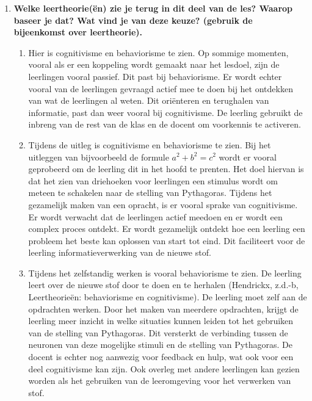 \documentclass{article}
\begin{document}
\begin{enumerate}[label=(\alph*)]
\begin{enumerate}[label=\arabic*.]
                    \end{enumerate}
                \item \textbf{Welke leertheorie(ën) zie je terug in dit deel van de les? Waarop baseer je dat? Wat vind je van deze keuze? (gebruik de bijeenkomst over leertheorie).} \\
                    \begin{enumerate}[label=\arabic*.]
                        \item Hier is cognitivisme en behaviorisme te zien. Op sommige momenten, vooral als er een koppeling wordt gemaakt naar het lesdoel, zijn de leerlingen vooral passief. Dit past bij behaviorisme. Er wordt echter vooral van de leerlingen gevraagd actief mee te doen bij het ontdekken van wat de leerlingen al weten. Dit oriënteren en terughalen van informatie, past dan weer vooral bij cognitivisme. De leerling gebruikt de inbreng van de rest van de klas en de docent om voorkennis te activeren.\\
                        \item Tijdens de uitleg is cognitivisme en behaviorisme te zien. Bij het uitleggen van bijvoorbeeld de formule $a^2 + b^2 = c^2$ wordt er vooral geprobeerd om de leerling dit in het hoofd te prenten. Het doel hiervan is dat het zien van driehoeken voor leerlingen een stimulus wordt om meteen te schakelen naar de stelling van Pythagoras. Tijdens het gezamelijk maken van een opracht, is er vooral sprake van cognitivisme. Er wordt verwacht dat de leerlingen actief meedoen en er wordt een complex proces ontdekt. Er wordt gezamelijk ontdekt hoe een leerling een probleem het beste kan oplossen van start tot eind. Dit faciliteert voor de leerling informatieverwerking van de nieuwe stof.\\
                        \item Tijdens het zelfstandig werken is vooral behaviorisme te zien. De leerling leert over de nieuwe stof door te doen en te herhalen (Hendrickx, z.d.-b, Leertheorieën: behaviorisme en cognitivisme). De leerling moet zelf aan de opdrachten werken. Door het maken van meerdere opdrachten, krijgt de leerling meer inzicht in welke situaties kunnen leiden tot het gebruiken van de stelling van Pythagoras. Dit versterkt de verbinding tussen de neuronen van deze mogelijke stimuli en de stelling van Pythagoras. De docent is echter nog aanwezig voor feedback en hulp, wat ook voor een deel cognitivisme kan zijn. Ook overleg met andere leerlingen kan gezien worden als het gebruiken van de leeromgeving voor het verwerken van stof. 
                    \end{enumerate}
            \end{enumerate}
    
\end{document}
